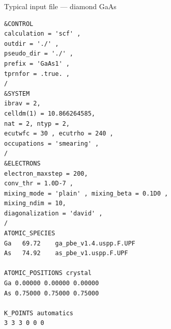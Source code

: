 \documentclass[]{beamer}
\begin{document}
\begin{frame}[fragile]
\begin{block}{Typical input file --- diamond GaAs}
\begin{tiny}
\begin{verbatim}
&CONTROL
calculation = 'scf' ,
outdir = './' ,
pseudo_dir = './' ,
prefix = 'GaAs1' ,
tprnfor = .true. ,
/
&SYSTEM
ibrav = 2,
celldm(1) = 10.866264585,
nat = 2, ntyp = 2,
ecutwfc = 30 , ecutrho = 240 ,
occupations = 'smearing' ,
/
&ELECTRONS
electron_maxstep = 200,
conv_thr = 1.0D-7 ,
mixing_mode = 'plain' , mixing_beta = 0.1D0 ,
mixing_ndim = 10,
diagonalization = 'david' ,
/
ATOMIC_SPECIES
Ga   69.72    ga_pbe_v1.4.uspp.F.UPF
As   74.92    as_pbe_v1.uspp.F.UPF

ATOMIC_POSITIONS crystal
Ga 0.00000 0.00000 0.00000
As 0.75000 0.75000 0.75000

K_POINTS automatics
3 3 3 0 0 0
\end{verbatim}
\end{tiny}
\end{block}

\end{frame}
\end{document}
